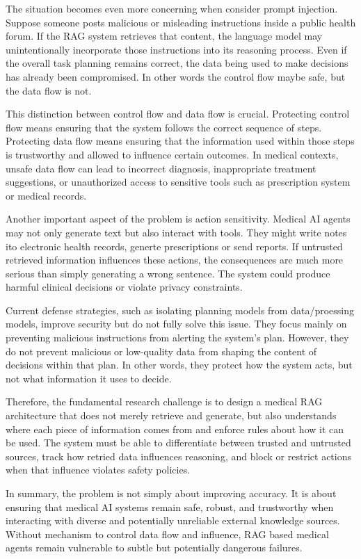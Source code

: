 \documentclass[conference, anonymous]{IEEEtran}
\begin{document}
The situation becomes even more concerning when consider prompt injection. Suppose someone posts malicious or misleading instructions inside a public health forum. If the RAG system retrieves that content, the language model may unintentionally incorporate those instructions into its reasoning process. Even if the overall task planning remains correct, the data being used to make decisions has already been compromised. In other words the control flow maybe safe, but the data flow is not.

This distinction between control flow and data flow is crucial. Protecting control flow means ensuring that the system follows the correct sequence of steps. Protecting data flow means ensuring that the information used within those steps is trustworthy and allowed to influence certain outcomes. In medical contexts, unsafe data flow can lead to incorrect diagnosis, inappropriate treatment suggestions, or unauthorized access to sensitive tools such as prescription system or medical records.

Another important aspect of the problem is action sensitivity. Medical AI agents may not only generate text but also interact with tools. They might write notes ito electronic health records, generte prescriptions or send reports. If untrusted retrieved information influences these actions, the consequences are much more serious than simply generating a wrong sentence. The system could produce harmful clinical decisions or violate privacy constraints.

Current defense strategies, such as isolating planning models from data/proessing models, improve security but do not fully solve this issue. They focus mainly on preventing malicious instructions from alerting the system's plan. However, they do not prevent malicious or low-quality data from shaping the content of decisions within that plan. In other words, they protect how the system acts, but not what information it uses to decide.

Therefore, the fundamental research challenge is to design a medical RAG architecture that does not merely retrieve and generate, but also understands where each piece of information comes from and enforce rules about how it can be used. The system must be able to differentiate between trusted and untrusted sources, track how retried data influences reasoning, and block or restrict actions when that influence violates safety policies. 

In summary, the problem is not simply about improving accuracy. It is about ensuring that medical AI systems remain safe, robust, and trustworthy when interacting with diverse and potentially unreliable external knowledge sources. Without mechanism to control data flow and influence, RAG based medical agents remain vulnerable to subtle but potentially dangerous failures.
\end{document}
